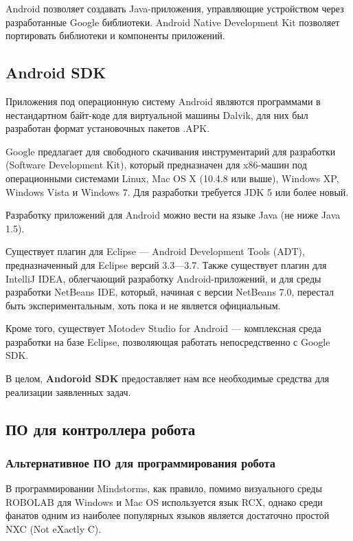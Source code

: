 Android позволяет создавать Java-приложения, управляющие устройством через разработанные Google библиотеки. Android Native Development Kit позволяет портировать библиотеки и компоненты приложений.

\subsection{Android SDK}

Приложения под операционную систему Android являются программами в нестандартном байт-коде для виртуальной машины Dalvik, для них был разработан формат установочных пакетов .APK.

Google предлагает для свободного скачивания инструментарий для разработки (Software Development Kit), который предназначен для x86-машин под операционными системами Linux, Mac OS X (10.4.8 или выше), Windows XP, Windows Vista и Windows 7. Для разработки требуется JDK 5 или более новый.

Разработку приложений для Android можно вести на языке Java (не ниже Java 1.5).

Существует плагин для Eclipse — Android Development Tools (ADT), предназначенный для Eclipse версий 3.3—3.7. Также существует плагин для IntelliJ IDEA, облегчающий разработку Android-приложений, и для среды разработки NetBeans IDE, который, начиная с версии NetBeans 7.0, перестал быть экспериментальным, хоть пока и не является официальным.

Кроме того, существует Motodev Studio for Android — комплексная среда разработки на базе Eclipse, позволяющая работать непосредственно с Google SDK.

В целом, \textbf{Andoroid SDK} предоставляет нам все необходимые средства для реализации заявленных задач.

\subsection{ПО для контроллера робота}

\subsubsection{Альтернативное ПО для программирования робота}
В программировании Mindstorms, как правило, помимо визуального среды ROBOLAB для Windows и Mac OS используется язык RCX, однако среди фанатов одним из наиболее популярных языков является достаточно простой NXC (Not eXactly C). 


